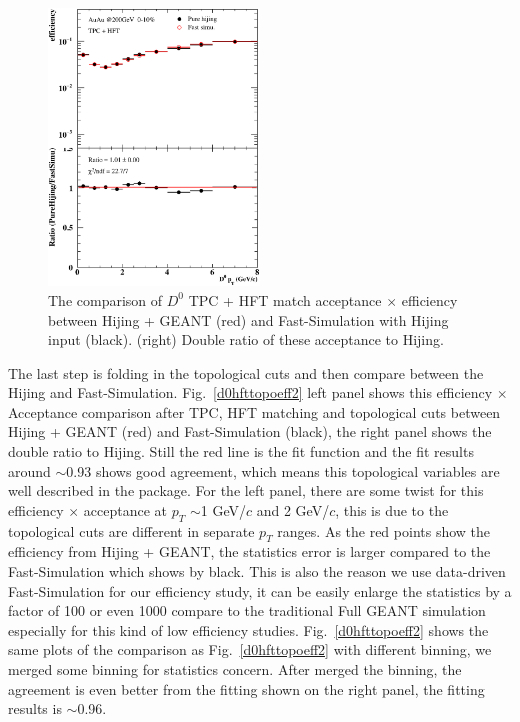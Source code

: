 \begin{figure}[htbp]
\centering
\includegraphics[keepaspectratio,width=0.5\textwidth]{figure/Run14_D0HFT/TpcHft_0_10.eps}
\caption{The comparison of $D^0$ TPC + HFT match acceptance $\times$ efficiency between Hijing + GEANT (red) and Fast-Simulation with Hijing input (black). (right) Double ratio of these acceptance to Hijing.}
\label{d0hftmatcheff}
\end{figure}

The last step is folding in the topological cuts and then compare between the Hijing and Fast-Simulation. Fig.~\ref{d0hfttopoeff2} left panel shows this efficiency $\times$ Acceptance comparison after TPC, HFT matching and topological cuts between Hijing + GEANT (red) and Fast-Simulation (black), the right panel shows the double ratio to Hijing. Still the red line is the fit function and the fit results around $\sim$0.93 shows good agreement, which means this topological variables are well described in the package. For the left panel, there are some twist for this efficiency $\times$ acceptance at $p_T$ $\sim$1 GeV/$c$ and 2 GeV/$c$, this is due to the topological cuts are different in separate $p_T$ ranges. As the red points show the efficiency from Hijing + GEANT, the statistics error is larger compared to the Fast-Simulation which shows by black. This is also the reason we use data-driven Fast-Simulation for our efficiency study, it can be easily enlarge the statistics by a factor of 100 or even 1000 compare to the traditional Full GEANT simulation especially for this kind of low efficiency studies. Fig.~\ref{d0hfttopoeff2} shows the same plots of the comparison as Fig.~\ref{d0hfttopoeff2} with different binning, we merged some binning for statistics concern. After merged the binning, the agreement is even better from the fitting shown on the right panel, the fitting results is $\sim$0.96.

